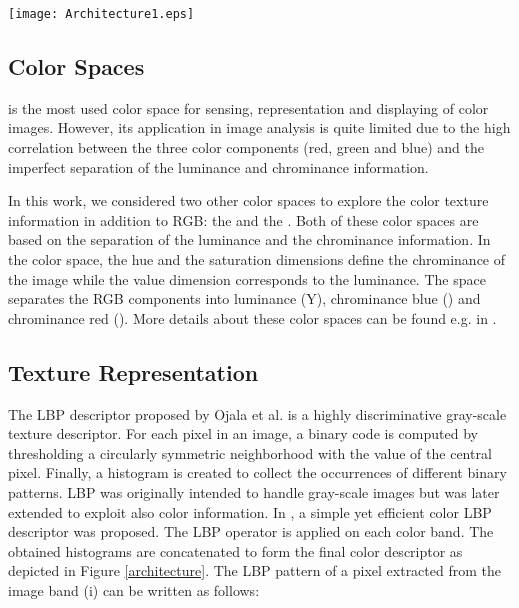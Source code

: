 \documentclass{article}
\begin{document}
\begin{figure*}[t]
	\begin{center}
		\texttt{[image: Architecture1.eps]}		
	\end{center}
		\vspace{-6mm}
	\caption{Architecture of the proposed face anti-spoofing approach}
	\label{architecture}
\end{figure*}

	\vspace{-4mm}
\subsection{Color Spaces}
 is the most used color space for sensing, representation and displaying of color images. However,  its application in image analysis is quite limited due to the high correlation between the three color components (red, green and blue) and the imperfect separation of the luminance and chrominance information.

In this work, we considered two other color spaces to explore the color texture information in addition to RGB: the  and the . Both of these color spaces are based on the separation of the luminance and the chrominance information. In the  color space, the hue and the saturation dimensions define the chrominance of the image while the value dimension corresponds to the luminance. The  space separates the RGB components into luminance (Y), chrominance blue () and chrominance red (). More details about these color spaces can be found e.g. in  \cite{color_image}. 
	\vspace{-3mm}
\subsection{Texture Representation}  
The LBP descriptor proposed by Ojala et al. \cite{lbp_ojala} is a highly discriminative gray-scale texture descriptor. For each pixel in an image, a binary code is computed by thresholding a circularly symmetric neighborhood with the value of the central pixel. Finally, a histogram is created to collect the occurrences of different binary patterns. LBP was originally intended to handle gray-scale images but was later extended to exploit also color information. In \cite{color_lbp}, a simple yet efficient color LBP descriptor was proposed. The LBP operator is applied on each color band. The obtained histograms are concatenated to form the final color descriptor as depicted in Figure \ref{architecture}. The LBP pattern of a pixel  extracted from the image band (i) can be written as follows:   
\end{document}
